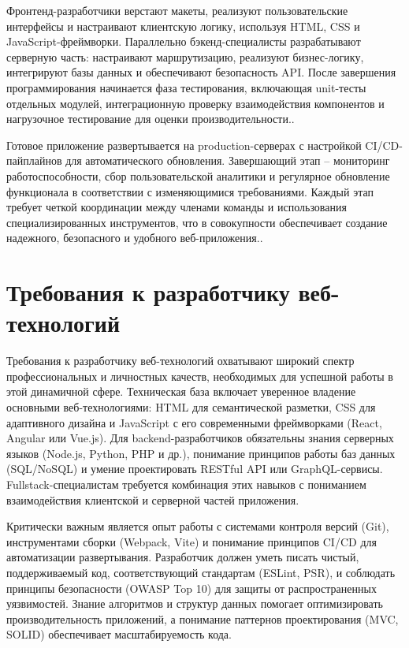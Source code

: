 \documentclass[referat]{SCWorks}
\begin{document}
Фронтенд-разработчики верстают макеты, реализуют пользовательские интерфейсы и настраивают клиентскую логику, используя HTML, CSS и JavaScript-фреймворки.\cite{frontend_web_development} Параллельно бэкенд-специалисты разрабатывают серверную часть: настраивают маршрутизацию, реализуют бизнес-логику, интегрируют базы данных и обеспечивают безопасность API.\cite{backend_web_development} После завершения программирования начинается фаза тестирования, включающая unit-тесты отдельных модулей, интеграционную проверку взаимодействия компонентов и нагрузочное тестирование для оценки производительности.\cite{mdn_web_docs}.

Готовое приложение развертывается на production-серверах с настройкой CI/CD-пайплайнов для автоматического обновления. Завершающий этап -- мониторинг работоспособности, сбор пользовательской аналитики и регулярное обновление функционала в соответствии с изменяющимися требованиями. Каждый этап требует четкой координации между членами команды и использования специализированных инструментов, что в совокупности обеспечивает создание надежного, безопасного и удобного веб-приложения.\cite{react_docs}.

\section{Требования к разработчику веб-технологий}

Требования к разработчику веб-технологий охватывают широкий спектр профессиональных и личностных качеств, необходимых для успешной работы в этой динамичной сфере. Техническая база включает уверенное владение основными веб-технологиями: HTML для семантической разметки, CSS для адаптивного дизайна и JavaScript с его современными фреймворками (React, Angular или Vue.js).\cite{web_technologies}\cite{frontend_web_development} Для backend-разработчиков обязательны знания серверных языков (Node.js, Python, PHP и др.), понимание принципов работы баз данных (SQL/NoSQL) и умение проектировать RESTful API или GraphQL-сервисы.\cite{backend_development} Fullstack-специалистам требуется комбинация этих навыков с пониманием взаимодействия клиентской и серверной частей приложения.\cite{fullstack_guide}

Критически важным является опыт работы с системами контроля версий (Git), инструментами сборки (Webpack, Vite) и понимание принципов CI/CD для автоматизации развертывания.\cite{mdn_web_docs} Разработчик должен уметь писать чистый, поддерживаемый код, соответствующий стандартам (ESLint, PSR), и соблюдать принципы безопасности (OWASP Top 10) для защиты от распространенных уязвимостей. Знание алгоритмов и структур данных помогает оптимизировать производительность приложений, а понимание паттернов проектирования (MVC, SOLID) обеспечивает масштабируемость кода.\cite{web_security}
\end{document}
